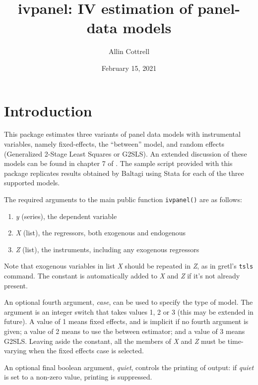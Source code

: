 \documentclass{article}
\begin{document}
\setlength{\parindent}{0pt}
\setlength{\parskip}{1ex}

\newcommand{\argname}[1]{\textsl{#1}}

\title{\textsf{ivpanel}: IV estimation of panel-data models}
\author{Allin Cottrell}
\date{February 15, 2021}
\maketitle

\section{Introduction}

This package estimates three variants of panel data models with
instrumental variables, namely fixed-effects, the ``between'' model,
and random effects (Generalized 2-Stage Least Squares or G2SLS). An
extended discussion of these models can be found in chapter 7 of
\cite{baltagi05}. The sample script provided with this package
replicates results obtained by Baltagi using \textsf{Stata} for
each of the three supported models.

The required arguments to the main public function \texttt{ivpanel()}
are as follows:

\begin{enumerate}
\item \argname{y} (series), the dependent variable
\item \argname{X} (list), the regressors, both exogenous and endogenous
\item \argname{Z} (list), the instruments, including any exogenous
  regressors
\end{enumerate}

Note that exogenous variables in list \argname{X} should be repeated
in \argname{Z}, as in gretl's \texttt{tsls} command. The constant is
automatically added to \argname{X} and \argname{Z} if it's not already
present.

An optional fourth argument, \argname{case}, can be used to specify
the type of model. The argument is an integer switch that takes values
1, 2 or 3 (this may be extended in future).  A value of 1 means fixed
effects, and is implicit if no fourth argument is given; a value of 2
means to use the between estimator; and a value of 3 means G2SLS.
Leaving aside the constant, all the members of \argname{X} and
\argname{Z} must be time-varying when the fixed effects case is
selected.

An optional final boolean argument, \argname{quiet}, controls the
printing of output: if \argname{quiet} is set to a non-zero value,
printing is suppressed.
\end{document}
